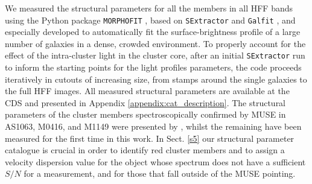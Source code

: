 \documentclass{aa}
\begin{document}
We measured the structural parameters for all the members in all HFF bands using the Python package \texttt{MORPHOFIT} \citep{tortorellimercurio,tortorelli18,tortorelli23}, based on \texttt{SExtractor} \citep{bertin96} and \texttt{Galfit} \citep{peng10}, and especially developed to automatically fit the surface-brightness profile of a large number of galaxies in a dense, crowded environment. To properly account for the effect of the intra-cluster light in the cluster core, after an initial \texttt{SExtractor} run to inform the starting points for the light profiles parameters, the code proceeds iteratively in cutouts of increasing size, from stamps around the single galaxies to the full HFF images. All measured structural parameters are available at the CDS and presented in Appendix \ref{appendix:cat_description}. The structural parameters of the cluster members spectroscopically confirmed by MUSE in AS1063, M0416, and M1149 were presented by \citet{tortorelli23}, whilst the remaining have been measured for the first time in this work. In Sect. \ref{s5} our structural parameter catalogue is crucial in order to identify red cluster members and to assign a velocity dispersion value for the object whose spectrum does not have a sufficient $S/N$ for a measurement, and for those that fall outside of the MUSE pointing.
\end{document}
